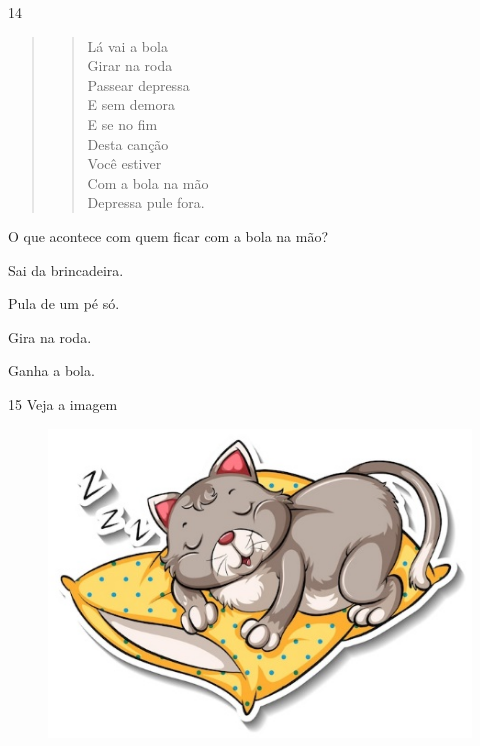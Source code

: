 \num{14}

\begin{quote}
\begin{verse}
Lá vai a bola\\
Girar na roda\\
Passear depressa\\
E sem demora\\
E se no fim\\
Desta canção\\
Você estiver\\
Com a bola na mão\\
Depressa pule fora.
\end{verse}

\end{quote}

O que acontece com quem ficar com a bola na mão?

\begin{multicols}{2}
\begin{escolha}
\item Sai da brincadeira.

\item Pula de um pé só.

\item Gira na roda.

\item Ganha a bola.
\end{escolha}
\end{multicols}

\pagebreak
\num{15} Veja a imagem

\begin{figure}[htpb!]
\centering
\includegraphics[width=.5\textwidth]{media/image161.jpeg}
\end{figure}


